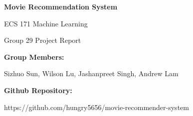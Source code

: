 \begin{titlepage}
    \begin{center}
        \vspace*{1cm}
        
        \Huge
        \textbf{Movie Recommendation System}
        
        \vspace{0.5cm}
        \LARGE
        ECS 171 Machine Learning
        
        \vspace{0.5cm}
        \LARGE
        Group 29 Project Report

        
        \vspace{1.5cm}
        \textbf{Group Members:}
        
        \vspace{0.5cm}
        Sizhuo Sun, Wilson Lu, Jashanpreet Singh, Andrew Lam
        
        \vspace{1.5cm}
        \textbf{Github Repository:}

        \vspace{0.5cm}
        https://github.com/hungry5656/movie-recommender-system
        
        \vfill
        
    \end{center}
\end{titlepage}